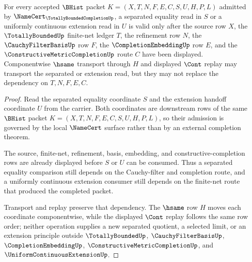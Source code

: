 \begin{theorem}
\label{thm:totally-bounded-completion-separated-extension-obligation}
For every accepted $\BHist$ packet $K=(X,T,N,F,E,C,S,U,H,P,L)$ admitted by $\NameCert_{\TotallyBoundedCompletionUp}$, a separated equality read in $S$ or a uniformly continuous extension read in $U$ is valid only after the source row $X$, the $\TotallyBoundedUp$ finite-net ledger $T$, the refinement row $N$, the $\CauchyFilterBasisUp$ row $F$, the $\CompletionEmbeddingUp$ row $E$, and the $\ConstructiveMetricCompletionUp$ route $C$ have been displayed. Componentwise $\hsame$ transport through $H$ and displayed $\Cont$ replay may transport the separated or extension read, but they may not replace the dependency on $T,N,F,E,C$.
\end{theorem}
\begin{proof}
Read the separated equality coordinate $S$ and the extension handoff coordinate $U$ from the carrier. Both coordinates are downstream rows of the same $\BHist$ packet $K=(X,T,N,F,E,C,S,U,H,P,L)$, so their admission is governed by the local $\NameCert$ surface rather than by an external completion theorem.

The source, finite-net, refinement, basis, embedding, and constructive-completion rows are already displayed before $S$ or $U$ can be consumed. Thus a separated equality comparison still depends on the Cauchy-filter and completion route, and a uniformly continuous extension consumer still depends on the finite-net route that produced the completed packet.

Transport and replay preserve that dependency. The $\hsame$ row $H$ moves each coordinate componentwise, while the displayed $\Cont$ replay follows the same row order; neither operation supplies a new separated quotient, a selected limit, or an extension principle outside $\TotallyBoundedUp$, $\CauchyFilterBasisUp$, $\CompletionEmbeddingUp$, $\ConstructiveMetricCompletionUp$, and $\UniformContinuousExtensionUp$.
\end{proof}

